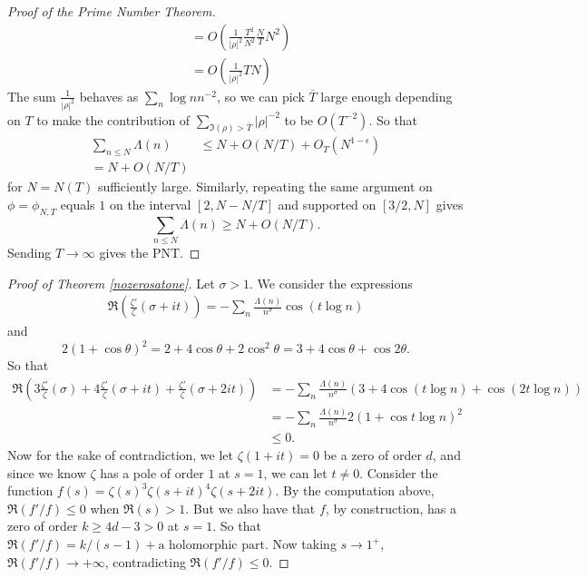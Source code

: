 \begin{proof}[Proof of the Prime Number Theorem]
\begin{align*}
    &= O(\frac{1}{|\rho|^2} \frac{T^2}{N^2} \frac{N}{T} N^2)\\
    &=O(\frac{1}{|\rho|^2} TN)
\end{align*}
The sum $\frac{1}{|\rho|^2}$ behaves as $\sum_n \log n n^{-2}$, so we can pick $\bar{T}$ large enough depending on $T$
to make the contribution of $\sum_{\Im(\rho)>\bar{T}} |\rho|^{-2}$ to be $O(T^{-2})$.
So that 
\begin{align*}
    \sum_{n\leq N}\Lambda(n)&\leq N +O(N/T)+ O_T(N^{1-\epsilon})\\
    = N+O(N/T)
\end{align*}
for $N=N(T)$ sufficiently large.
Similarly, repeating the same argument on $\phi=\phi_{N,T}$ equals $1$ on the interval $[2,N-N/T]$ and supported on $[3/2, N]$
gives \[
    \sum_{n\leq N}\Lambda(n)\geq N+O(N/T).
\]
Sending $T\to\infty$ gives the PNT.
\end{proof}

\begin{proof}[Proof of Theorem \ref{nozerosatone}]
    Let $\sigma > 1$. We consider the expressions \begin{align*}
        \Re\left(\frac{\zeta'}{\zeta}(\sigma+it)\right) = -\sum_{n} \frac{\Lambda(n)}{n^\sigma}\cos (t\log n) 
    \end{align*}
    and \[
    2(1+\cos \theta)^2 =2+4\cos \theta + 2\cos^2 \theta = 3+4\cos\theta + \cos 2\theta.
    \]
    So that \begin{align*}
        \Re\left(3\frac{\zeta'}{\zeta}(\sigma)+ 4\frac{\zeta'}{\zeta}(\sigma+it) +\frac{\zeta'}{\zeta}(\sigma+2it)\right)
        &= -\sum_{n} \frac{\Lambda(n)}{n^\sigma}(3+4\cos (t\log n)+\cos (2t\log n))\\
        &= -\sum_{n} \frac{\Lambda(n)}{n^\sigma} 2(1+\cos t\log n)^2\\
        &\leq 0.
    \end{align*}
    Now for the sake of contradiction, we let $\zeta(1+it)=0$ be a zero of order $d$, and since we know $\zeta$ has a pole of order $1$ at $s=1$, we can let $t\neq 0$. 
    Consider the function $f(s)=\zeta(s)^3\zeta(s+it)^4\zeta(s+2it)$.
    By the computation above, $\Re(f'/f)\leq 0$ when $\Re(s)> 1$.
    But we also have that $f$, by construction, has a zero of order $k\geq 4d-3>0$ at $s=1$.
    So that $\Re(f'/f) = k/(s-1)+ \textrm{a holomorphic part}$. Now taking $s\to 1^{+}$, $\Re(f'/f)\to +\infty$, contradicting $\Re(f'/f)\leq 0$.
\end{proof}
